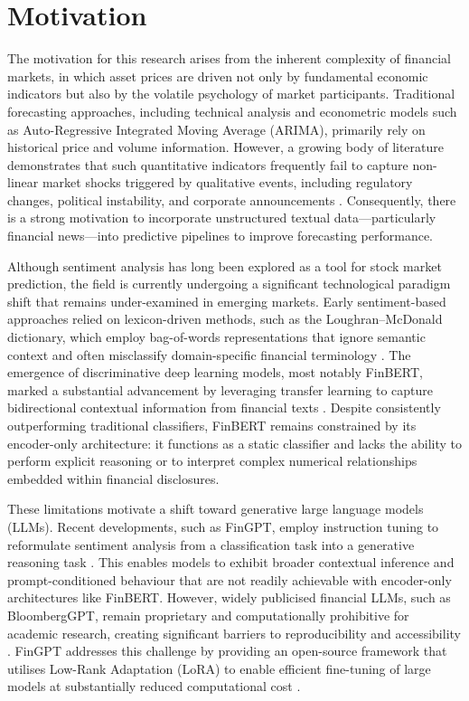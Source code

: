 \documentclass[12pt]{ucetd}
\begin{document}
\section{Motivation}

The motivation for this research arises from the inherent complexity of financial markets, in which asset prices are driven not only by fundamental economic indicators but also by the volatile psychology of market participants. Traditional forecasting approaches, including technical analysis and econometric models such as Auto-Regressive Integrated Moving Average (ARIMA), primarily rely on historical price and volume information. However, a growing body of literature demonstrates that such quantitative indicators frequently fail to capture non-linear market shocks triggered by qualitative events, including regulatory changes, political instability, and corporate announcements \cite{tetlock2007giving, atkins2018financial}. Consequently, there is a strong motivation to incorporate unstructured textual data---particularly financial news---into predictive pipelines to improve forecasting performance.

Although sentiment analysis has long been explored as a tool for stock market prediction, the field is currently undergoing a significant technological paradigm shift that remains under-examined in emerging markets. Early sentiment-based approaches relied on lexicon-driven methods, such as the Loughran--McDonald dictionary, which employ bag-of-words representations that ignore semantic context and often misclassify domain-specific financial terminology \cite{loughran2011liability}. The emergence of discriminative deep learning models, most notably FinBERT, marked a substantial advancement by leveraging transfer learning to capture bidirectional contextual information from financial texts \cite{araci2019finbert, yang2020finbert}. Despite consistently outperforming traditional classifiers, FinBERT remains constrained by its encoder-only architecture: it functions as a static classifier and lacks the ability to perform explicit reasoning or to interpret complex numerical relationships embedded within financial disclosures.

These limitations motivate a shift toward generative large language models (LLMs). Recent developments, such as FinGPT, employ instruction tuning to reformulate sentiment analysis from a classification task into a generative reasoning task \cite{yang2023fingpt, zhang2023instructfingpt}. This enables models to exhibit broader contextual inference and prompt-conditioned behaviour that are not readily achievable with encoder-only architectures like FinBERT. However, widely publicised financial LLMs, such as BloombergGPT, remain proprietary and computationally prohibitive for academic research, creating significant barriers to reproducibility and accessibility \cite{wu2023bloomberggpt}. FinGPT addresses this challenge by providing an open-source framework that utilises Low-Rank Adaptation (LoRA) to enable efficient fine-tuning of large models at substantially reduced computational cost \cite{hu2022lora, yang2023fingpt}.
\end{document}
